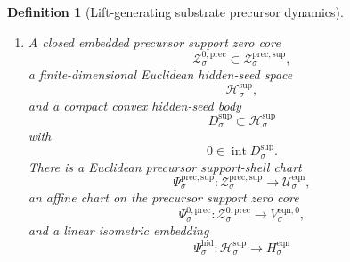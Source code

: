 \documentclass[11pt]{article}
\newcommand{\EqnSpace}[1]{\mathcal U_{#1}^{\mathrm{eqn}}}
\newcommand{\EqnHidden}[1]{H_{#1}^{\mathrm{eqn}}}
\newcommand{\EqnZero}[1]{V_{#1}^{\mathrm{eqn},0}}
\newcommand{\ResSpace}[1]{\mathcal U_{#1}^{\mathrm{sup,res}}}
\newcommand{\ResBody}[1]{\mathcal B_{#1}^{\mathrm{sup,res}}}
\newcommand{\ResPair}[1]{\mathfrak m_{#1}^{\mathrm{sup,res}}}
\newcommand{\ResSection}[1]{\Theta_{#1}^{\mathrm{sup,res}}}
\newcommand{\ResData}[1]{\Lambda_{#1}^{\mathrm{sup,dat}}}
\newcommand{\ResShellMap}[1]{\Lambda_{#1}^{\mathrm{sup,sh}}}
\newcommand{\ResShellSet}[1]{\mathcal Z_{#1}^{\mathrm{sup,res}}}
\newcommand{\SeedHidden}[1]{\mathcal H_{#1}^{\mathrm{sup}}}
\newcommand{\SeedHiddenBody}[1]{D_{#1}^{\mathrm{sup}}}
\newcommand{\HiddenChart}[1]{\Psi_{#1}^{\mathrm{hid}}}
\newcommand{\LiftSupportShell}[1]{\mathcal Z_{#1}^{\mathrm{lift,sup}}}
\newcommand{\PrecProj}[1]{\Pi_{#1}^{\mathrm{prec}}}
\newcommand{\PrecShellSet}[1]{\mathcal Z_{#1}^{\mathrm{prec}}}
\newcommand{\PrecChart}[1]{\Xi_{#1}^{\mathrm{prec}}}
\newcommand{\PrecSupport}[1]{\Theta_{#1}^{\mathrm{prec,sup}}}
\newcommand{\PrecSupportShell}[1]{\mathcal Z_{#1}^{\mathrm{prec,sup}}}
\newcommand{\PrecZeroCore}[1]{\mathcal Z_{#1}^{0,\mathrm{prec}}}
\newcommand{\PrecEqChart}[1]{\Psi_{#1}^{\mathrm{prec,sup}}}
\newcommand{\PrecZeroChart}[1]{\Psi_{#1}^{0,\mathrm{prec}}}
\newtheorem{definition}{Definition}
\begin{document}
\begin{definition}[Lift-generating substrate precursor dynamics]
\begin{enumerate}
\[    \]
    satisfying
    \begin{equation}
    \ResSection{\sigma}\circ\PrecChart{\sigma}
    =
    \PrecSupport{\sigma}.
    \label{eq:precsupporttransport}
    \end{equation}
    Define the exact precursor support shell
    \begin{equation}
    \PrecSupportShell{\sigma}
    \equiv
    \bigl(\PrecSupport{\sigma}\bigr)^{-1}(0)\cap\PrecShellSet{\sigma},
    \label{eq:precsupportshell}
    \end{equation}
    and assume
    \begin{equation}
    \ResShellSet{\sigma}
    \equiv
    \bigl(\ResSection{\sigma}\bigr)^{-1}(0)\cap\ResBody{\sigma}
    =
    \PrecChart{\sigma}\bigl(\PrecSupportShell{\sigma}\bigr).
    \label{eq:prectransportedsupportshell}
    \end{equation}
    Assume there exists \(\nu_{\sigma}^{\mathrm{sup}}>0\) such that
    \begin{equation}
    \ResPair{\sigma}\bigl(\ResSection{\sigma}(u),\ResSection{\sigma}(u)\bigr)
    \ge
    \nu_{\sigma}^{\mathrm{sup}}\,
    \operatorname{dist}\bigl(u,\ResShellSet{\sigma}\bigr)^{2}
    \qquad
    \text{for all }u\in\ResBody{\sigma}.
    \label{eq:precnormal}
    \end{equation}
    Assume the restriction of \(\PrecProj{\sigma}\) to \(\PrecSupportShell{\sigma}\) is a diffeomorphism onto its image
    \[
    \LiftSupportShell{\sigma}
    \equiv
    \PrecProj{\sigma}\bigl(\PrecSupportShell{\sigma}\bigr).
    \]
    The transported symmetry and time-reversal actions act linearly on \(\ResSpace{\sigma}\), preserving \(\ResBody{\sigma}\), \(\ResShellSet{\sigma}\), \(\ResSection{\sigma}\), \(\ResData{\sigma}\), and \(\ResShellMap{\sigma}\).
    \item A closed embedded precursor support zero core
    \[
    \PrecZeroCore{\sigma}\subset\PrecSupportShell{\sigma},
    \]
    a finite-dimensional Euclidean hidden-seed space
    \[
    \SeedHidden{\sigma},
    \]
    and a compact convex hidden-seed body
    \[
    \SeedHiddenBody{\sigma}\subset\SeedHidden{\sigma}
    \]
    with
    \[
    0\in\operatorname{int}\SeedHiddenBody{\sigma}.
    \]
    There is a Euclidean precursor support-shell chart
    \[
    \PrecEqChart{\sigma}:\PrecSupportShell{\sigma}\to\EqnSpace{\sigma},
    \]
    an affine chart on the precursor support zero core
    \[
    \PrecZeroChart{\sigma}:\PrecZeroCore{\sigma}\to\EqnZero{\sigma},
    \]
    and a linear isometric embedding
    \[
    \HiddenChart{\sigma}:\SeedHidden{\sigma}\to\EqnHidden{\sigma}
\]
\end{enumerate}
\end{definition}
\end{document}
